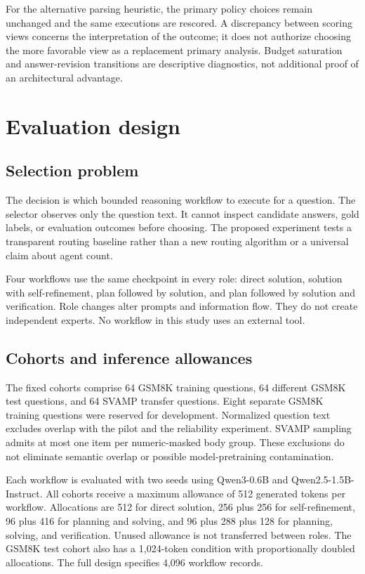 \documentclass[10pt]{article}
\begin{document}
For the alternative parsing heuristic, the primary policy choices remain
unchanged and the same executions are rescored. A discrepancy between scoring
views concerns the interpretation of the outcome; it does not authorize choosing
the more favorable view as a replacement primary analysis. Budget saturation
and answer-revision transitions are descriptive diagnostics, not additional
proof of an architectural advantage.

\section{Evaluation design}
\subsection{Selection problem}

The decision is which bounded reasoning workflow to execute for a question. The selector observes only the question text. It cannot inspect candidate answers, gold labels, or evaluation outcomes before choosing. The proposed experiment tests a transparent routing baseline rather than a new routing algorithm or a universal claim about agent count.

Four workflows use the same checkpoint in every role: direct solution, solution with self-refinement, plan followed by solution, and plan followed by solution and verification. Role changes alter prompts and information flow. They do not create independent experts. No workflow in this study uses an external tool.

\subsection{Cohorts and inference allowances}

The fixed cohorts comprise 64 GSM8K training questions, 64 different GSM8K test questions, and 64 SVAMP transfer questions. Eight separate GSM8K training questions were reserved for development. Normalized question text excludes overlap with the pilot and the reliability experiment. SVAMP sampling admits at most one item per numeric-masked body group. These exclusions do not eliminate semantic overlap or possible model-pretraining contamination.

Each workflow is evaluated with two seeds using Qwen3-0.6B and Qwen2.5-1.5B-Instruct. All cohorts receive a maximum allowance of 512 generated tokens per workflow. Allocations are 512 for direct solution, 256 plus 256 for self-refinement, 96 plus 416 for planning and solving, and 96 plus 288 plus 128 for planning, solving, and verification. Unused allowance is not transferred between roles. The GSM8K test cohort also has a 1,024-token condition with proportionally doubled allocations. The full design specifies 4,096 workflow records.
\end{document}
